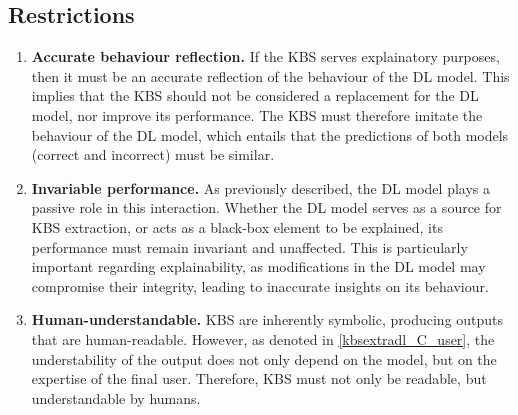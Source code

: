 \subsection{Restrictions}
\begin{enumerate} [start=1,label={\bfseries R\arabic*.}]
    \item \textbf{Accurate behaviour reflection.} \label{kbsextradl_R_behaviour} If the KBS serves explainatory purposes, then it must be an accurate reflection of the behaviour of the DL model. This implies that the KBS should not be considered a replacement for the DL model, nor improve its performance. The KBS must therefore imitate the behaviour of the DL model, which entails that the predictions of both models (correct and incorrect) must be similar.
    
    \item \textbf{Invariable performance.} \label{kbsextradl_R_performance} As previously described, the DL model plays a passive role in this interaction.  Whether the DL model serves as a source for KBS extraction, or acts as a black-box element to be explained, its performance must remain invariant and unaffected. This is particularly important regarding explainability, as modifications in the DL model may compromise their integrity, leading to inaccurate insights on its behaviour. 
    
    \item \textbf{Human-understandable.} \label{kbsextradl_R_human} KBS are inherently symbolic, producing outputs that are human-readable. However, as denoted in \ref{kbsextradl_C_user}, the understability of the output does not only depend on the model, but on the expertise of the final user. Therefore, KBS must not only be readable, but understandable by humans.
\end{enumerate}

